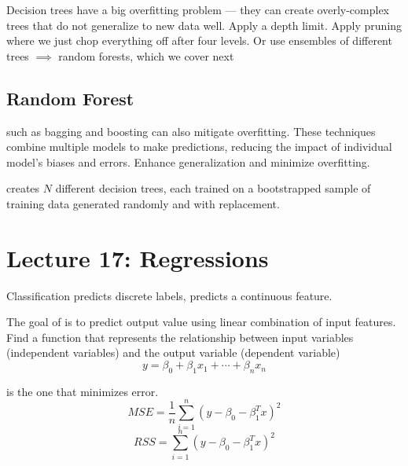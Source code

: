 \documentclass[12pt]{scrartcl}
\begin{document}
\begin{example}
  Decision trees have a big overfitting problem --- they can create overly-complex trees that 
  do not generalize to new data well. Apply a depth limit. Apply pruning where we just chop everything off after 
  four levels. Or use ensembles of different trees $\implies$ random forests, which we cover next
\end{example}

\subsection{Random Forest}

\begin{definition}
   such as bagging and boosting can also mitigate overfitting. These techniques 
  combine multiple models to make predictions, reducing the impact of individual model's biases and errors. 
  Enhance generalization and minimize overfitting.
\end{definition}

\begin{definition}
   creates $N$ different decision trees, each trained on a bootstrapped sample of training data generated 
  randomly and with replacement.
\end{definition}

\section{Lecture 17: Regressions}

\begin{definition}
  Classification predicts discrete labels,  predicts a continuous feature.
\end{definition}

\begin{definition}
  The goal of  is to predict output value 
  using linear combination of input features. Find a function that represents the 
  relationship between input variables (independent variables) and the output variable (dependent variable)
  \[y = \beta_0 + \beta_1 x_1 + \cdots + \beta_n x_n\]
\end{definition}

\begin{definition}
   is the one that minimizes error.
  \[MSE = \frac{1}{n}\sum_{i=1}^n (y - \beta_0 - \beta_1^T x)^2\]
  \[RSS = \sum_{i=1}^n (y - \beta_0 - \beta_1^T x)^2\]
\end{definition}
\end{document}
